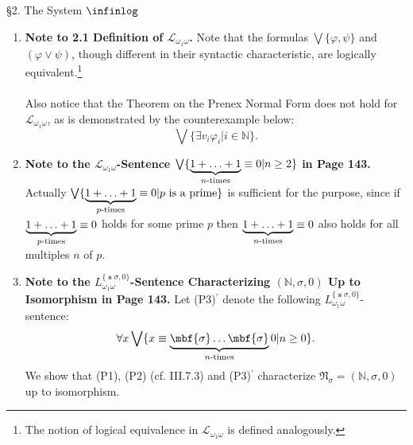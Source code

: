 \
\\
\\
{\large \S2. The System $\infinlog$}
\begin{enumerate}[1.]
\item \textbf{Note to 2.1 Definition of $\mathcal{L}_{\omega_1\omega}$.} Note that the formulas $\bigvee \{ \varphi, \psi \}$ and $(\varphi \lor \psi)$, though different in their syntactic characteristic, are logically equivalent.\footnote{The notion of logical equivalence in $\mathcal{L}_{\omega_1\omega}$ is defined analogously.}\\
\\
Also notice that the Theorem on the Prenex Normal Form does not hold for $\mathcal{L}_{\omega_1\omega}$, as is demonstrated by the counterexample below:
\[
\bigvee \{ \exists v_i \varphi_i | i \in \mathbb{N} \}.
\]
%
\item \textbf{Note to the $\mathcal{L}_{\omega_1\omega}$-Sentence $\bigvee \{ \underbrace{1 + \ldots + 1}_{\mbox{\scriptsize\begin{math}n\end{math}-times}} \equiv 0 | n \geq 2 \}$ in Page 143.} Actually $\bigvee \{ \underbrace{1 + \ldots + 1}_{\mbox{\scriptsize \begin{math}p\end{math}-times}} \equiv 0 | \mbox{\begin{math}p\end{math} is a prime} \}$ is sufficient for the purpose, since if $\underbrace{1 + \ldots + 1}_{\mbox{\scriptsize\begin{math}p\end{math}-times}} \equiv 0$ holds for some prime $p$ then $\underbrace{1 + \ldots + 1}_{\mbox{\scriptsize\begin{math}n\end{math}-times}} \equiv 0$ also holds for all multiples $n$ of $p$.
%
\item \textbf{Note to the $L^{ \{ \mbfs{\sigma}, 0 \} }_{\omega_1\omega}$-Sentence Characterizing $(\mathbb{N}, \sigma, 0)$ Up to Isomorphism in Page 143.} Let (P3)$^\prime$ denote the following $L^{ \{ \mbfs{\sigma}, 0 \} }_{\omega_1\omega}$-sentence:
\[
\forall x \bigvee \{ x \equiv \underbrace{\mbf{\sigma} \ldots \mbf{\sigma}}_{\mbox{\scriptsize $n$-times}} 0 | n \geq 0 \}.
\]
We show that (P1), (P2) (cf. III.7.3) and (P3)$^\prime$ characterize $\mathfrak{N}_\sigma = (\mathbb{N}, \sigma, 0)$ up to isomorphism.\\

\end{enumerate}
